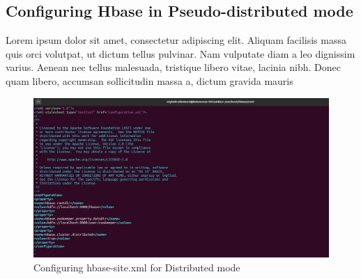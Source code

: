 \begin{spacing}{1.2}
\section{Configuring Hbase in Pseudo-distributed mode }
\par Lorem ipsum dolor sit amet, consectetur adipiscing elit. Aliquam facilisis massa quis orci volutpat, ut dictum tellus pulvinar. Nam vulputate diam a leo dignissim varius. Aenean nec tellus malesuada, tristique libero vitae, lacinia nibh. Donec quam libero, accumsan sollicitudin massa a, dictum gravida mauris
\\
\begin{figure}[!htb] 
\begin{center} 
\includegraphics[width=1\linewidth]{Pictures/HBase/Configuring Hbase in Standalone & Pseudo-distributed mode/Configuring Hbase in Pseudo-distributed mode/Configuring hbase-site.xml for Distributed mode} 
\end{center} 
\caption{Configuring hbase-site.xml for Distributed mode} 
\end{figure}  \FloatBarrier
\\


\end{spacing}
